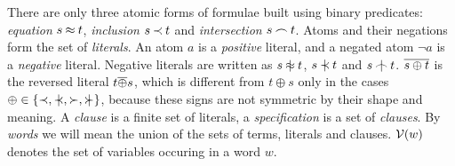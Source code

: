 There are only three atomic forms of formulae built using binary predicates: 
{\em equation} $s\mathbin{\approx} t$, {\em inclusion} $s\mathbin{\prec} t$ and {\em intersection} 
$s\mathbin{\frown} t$. Atoms and their negations form the set of {\em literals}. An atom 
$a$ is a {\em positive} literal, and a negated atom $\neg a$ is a {\em 
negative} literal. Negative literals are written as $s\notEq t$, 
$s\notIncl t$ and $s\notInt t$.  \(\overline{s\oplus t}\) is the reversed literal
\(t\overline{\oplus} s\), which is different from \(t\oplus s\) only in
the cases \(\oplus\in\{\Incl,\notIncl,\Cont,\notCont\}\), because these signs
are not symmetric by their shape and meaning.
A {\em clause} is a finite set of literals,
a {\em specification} is a set of {\em
clauses}.  
%
%
By {\em words} we will mean the union of the sets of terms, literals and
clauses.  \({\cal V}(w)\) denotes the set of variables occuring in a word $w$.

